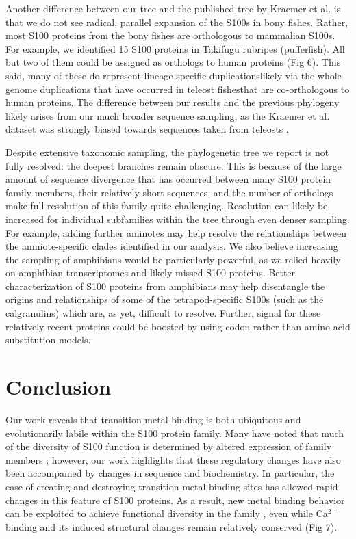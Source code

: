 Another difference between our tree and the published tree by Kraemer
et al. \cite{kraemer_structural_2008} is that we do not see radical,
parallel expansion of the S100s in bony fishes. Rather, most S100
proteins from the bony fishes are orthologous to mammalian S100s.
For example, we identified 15 S100 proteins in Takifugu rubripes (pufferfish).
All but two of them could be assigned as orthologs to human proteins
(Fig 6). This said, many of these do represent lineage-specific duplications\textemdash likely
via the whole genome duplications that have occurred in teleost fishes\textemdash that
are co-orthologous to human proteins. The difference between our results
and the previous phylogeny likely arises from our much broader sequence
sampling, as the Kraemer et al. dataset was strongly biased towards
sequences taken from teleosts \cite{kraemer_structural_2008}.

Despite extensive taxonomic sampling, the phylogenetic tree we report
is not fully resolved: the deepest branches remain obscure. This is
because of the large amount of sequence divergence that has occurred
between many S100 protein family members, their relatively short sequences,
and the number of orthologs make full resolution of this family quite
challenging. Resolution can likely be increased for individual subfamilies
within the tree through even denser sampling. For example, adding
further aminotes may help resolve the relationships between the amniote-specific
clades identified in our analysis. We also believe increasing the
sampling of amphibians would be particularly powerful, as we relied
heavily on amphibian transcriptomes and likely missed S100 proteins.
Better characterization of S100 proteins from amphibians may help
disentangle the origins and relationships of some of the tetrapod-specific
S100s (such as the calgranulins) which are, as yet, difficult to resolve.
Further, signal for these relatively recent proteins could be boosted
by using codon rather than amino acid substitution models.

\section{Conclusion}

Our work reveals that transition metal binding is both ubiquitous
and evolutionarily labile within the S100 protein family. Many have
noted that much of the diversity of S100 function is determined by
altered expression of family members \cite{marenholz_s100_2004,bertini_solution_2009,h_differential_1987,zimmer_tissue_1987,kuznicki_tissue_1989,zimmer_s100_1995,gribenko_molecular_2001};
however, our work highlights that these regulatory changes have also
been accompanied by changes in sequence and biochemistry. In particular,
the ease of creating and destroying transition metal binding sites
has allowed rapid changes in this feature of S100 proteins. As a result,
new metal binding behavior can be exploited to achieve functional
diversity in the family \cite{moroz_role_2010,gilston_binding_2016},
even while Ca$^{2+}$ binding and its induced structural changes remain
relatively conserved (Fig 7).

